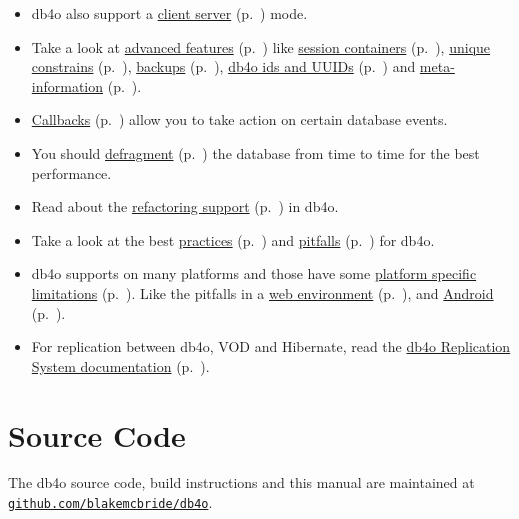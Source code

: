 \begin{itemize}
\item db4o also support a \hyperref[ref:client-server]{client server} (p.~\pageref{ref:client-server}) mode.
\item Take a look at \hyperref[ref:advanced-topics]{advanced features} (p.~\pageref{ref:advanced-topics}) like \hyperref[ref:advanced-topics-session-containers]{session containers} (p.~\pageref{ref:advanced-topics-session-containers}), \hyperref[ref:advanced-topics-unique-constraints]{unique constrains} (p.~\pageref{ref:advanced-topics-unique-constraints}), \hyperref[ref:advanced-topics-backup]{backups} (p.~\pageref{ref:advanced-topics-backup}), \hyperref[ref:advanced-topics-ids-and-uuids]{db4o ids and UUIDs} (p.~\pageref{ref:advanced-topics-ids-and-uuids}) and \hyperref[ref:advanced-topics-db4o-meta-information]{meta-information} (p.~\pageref{ref:advanced-topics-db4o-meta-information}).
\item \hyperref[ref:advanced-topics-callbacks]{Callbacks} (p.~\pageref{ref:advanced-topics-callbacks}) allow you to take action on certain database events.
\item You should \hyperref[ref:advanced-topics-defragment]{defragment} (p.~\pageref{ref:advanced-topics-defragment}) the database from time to time for the best performance.
\item Read about the \hyperref[ref:advanced-topics-refactoring-and-schema-evolution]{refactoring support} (p.~\pageref{ref:advanced-topics-refactoring-and-schema-evolution}) in db4o.
\item Take a look at the best \hyperref[ref:best-practises]{practices} (p.~\pageref{ref:best-practises}) and \hyperref[ref:usage-pitfalls]{pitfalls} (p.~\pageref{ref:usage-pitfalls}) for db4o.
\item db4o supports on many platforms and those have some \hyperref[ref:platform-specific-issues]{platform specific limitations} (p.~\pageref{ref:platform-specific-issues}). Like the pitfalls in a \hyperref[ref:platform-specific-issues-web-environment]{web environment} (p.~\pageref{ref:platform-specific-issues-web-environment}), and  \hyperref[ref:platform-specific-issues-android]{Android} (p.~\pageref{ref:platform-specific-issues-android}).
\item For replication between db4o, VOD and Hibernate, read the \hyperref[drs:welcome]{db4o Replication System documentation} (p.~\pageref{drs:welcome}).
\end{itemize}

\section*{Source Code}

The db4o source code, build instructions and this manual are maintained at \href{https://github.com/blakemcbride/db4o}{\nolinkurl{github.com/blakemcbride/db4o}}.

